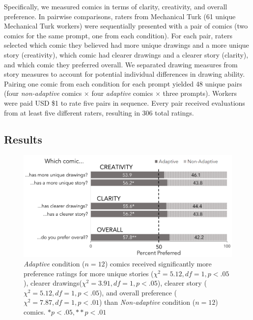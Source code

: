 Specifically, we measured comics in terms of clarity, creativity, and overall preference. In pairwise comparisons, raters from Mechanical Turk (61 unique Mechanical Turk workers) were sequentially presented with a pair of comics (two comics for the same prompt, one from each condition). For each pair, raters selected which comic they believed had more unique drawings and a more unique story (creativity), which comic had clearer drawings and a clearer story (clarity), and which comic they preferred overall. We separated drawing measures from story measures to account for potential individual differences in drawing ability. Pairing one comic from each condition for each prompt yielded 48 unique pairs (four \textit{non-adaptive} comics $\times$ four \textit{adaptive} comics $\times$ three prompts). Workers were paid USD \$1 to rate five pairs in sequence. Every pair received evaluations from at least five different raters, resulting in 306 total ratings.

\subsection{Results}

\begin{figure}
  \includegraphics[width=\textwidth]{shown/figures/woz-results.png}
  \caption[\textit{Adaptive} condition ($n=12$) comics received significantly more preference ratings for more unique stories ($\chi^2=5.12, df=1, p<.05$), clearer drawings($\chi^2=3.91, df=1, p<.05$), clearer story ($\chi^2=5.12, df=1, p<.05$), and overall preference ($
\chi^2=7.87, df=1, p<.01$)]{\textit{Adaptive} condition ($n=12$) comics received significantly more preference ratings for more unique stories ($\chi^2=5.12, df=1, p<.05$), clearer drawings($\chi^2=3.91, df=1, p<.05$), clearer story ($\chi^2=5.12, df=1, p<.05$), and overall preference ($
\chi^2=7.87, df=1, p<.01$) than \textit{Non-adaptive} condition ($n=12$) comics. $*p<.05, **p<.01$}
  \label{fig:woz}
\end{figure}

